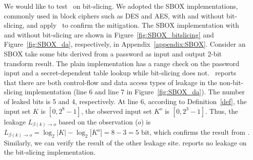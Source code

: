 We would like to test \tool\ on bit-slicing. We adopted the SBOX implementations,
commonly used in block ciphers such as DES and AES, with and without bit-slicing, and
apply \tool\ to confirm the mitigation. 
The SBOX implementation with and without bit-slicing are shown in Figure~\ref{fig:SBOX_bitslicing} and Figure~\ref{fig:SBOX_da}, respectively, in Appendix~\ref{appendix:SBOX}.
Consider an SBOX take some bits derived from a password as input and output 2-bit transform
result.
The plain implementation has a range check on the password input and a secret-dependent table lookup
while
bit-slicing does not.  
\tool\ reports that there are both control-flow and data access types of leakage in
the non-bit-slicing implementation  
(line 6 and line 7 in Figure~\ref{fig:SBOX_da}).
The number of leaked bits is 5
and 4, respectively. At line 6, according to
Definition~\ref{def}, the input set $K$ is $[0,2^8-1]$, the observed input set
$K^o$ is $[0,2^3-1]$. Thus, the leakage $L_{\beta(k)\rightarrow o}$ based on the
observation ($o$) is $L_{\beta(k)\rightarrow o} = \log_2{|K|} - \log_2{|K^o|} =
8-3 = 5$ bit, which confirms the result from \tool. Similarly, we can verify the
result of the other leakage site.  
\tool{} reports no leakage on the bit-slicing implementation. 

